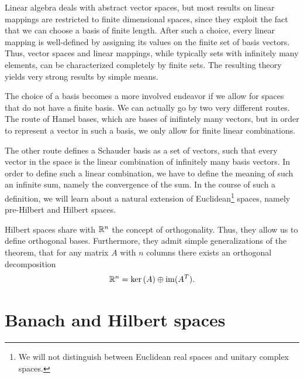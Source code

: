 
\begin{intro}
  Linear algebra deals with abstract vector spaces, but most results
  on linear mappings are restricted to finite dimensional spaces,
  since they exploit the fact that we can choose a basis of finite
  length. After such a choice, every linear mapping is well-defined by
  assigning its values on the finite set of basis vectors. Thus,
  vector spaces and linear mappings, while typically sets with
  infinitely many elements, can be characterized completely by finite
  sets. The resulting theory yields very strong results by simple means.

  The choice of a basis becomes a more involved endeavor if we allow
  for spaces that do not have a finite basis. We can actually go by
  two very different routes. The route of Hamel bases, which are bases
  of inifintely many vectors, but in order to represent a vector in
  such a basis, we only allow for finite linear combinations.
  
  The other route defines a Schauder basis as a set of vectors, such
  that every vector in the space is the linear combination of
  infinitely many basis vectors. In order to define such a linear
  combination, we have to define the meaning of such an infinite sum,
  namely the convergence of the sum. In the course of such a
  definition, we will learn about a natural extension of
  Euclidean\footnote{We will not distinguish between
    Euclidean real spaces and unitary complex spaces.}
  spaces, namely pre-Hilbert and Hilbert spaces.

  Hilbert spaces share with $\mathbb R^n$ the concept of orthogonality. Thus,
  they allow us to define orthogonal bases. Furthermore, they admit
  simple generalizations of the theorem, that for any matrix $A$ with
  $n$ columns there exists an orthogonal decomposition
  \begin{gather}
    \mathbb R^n = \operatorname{ker}\left(A\right) \oplus \operatorname{im}(A^T).
  \end{gather}
\end{intro}

\section{Banach and Hilbert spaces}

